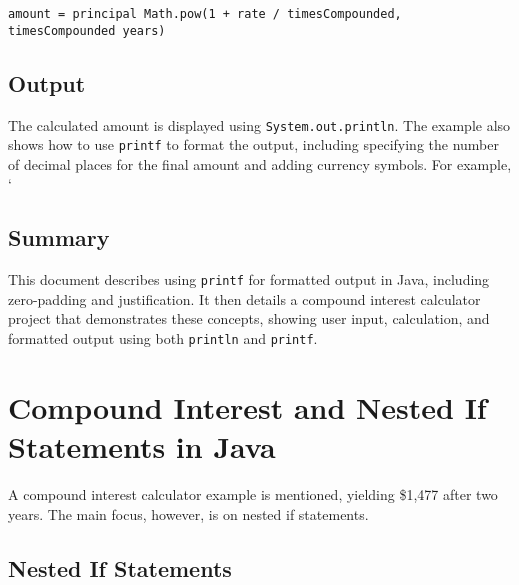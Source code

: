 \documentclass{article}
\begin{document}
\texttt{amount = principal \* Math.pow(1 + rate / timesCompounded, timesCompounded \* years)}

\subsection{Output}

The calculated amount is displayed using \texttt{System.out.println}.  The example also shows how to use \texttt{printf} to format the output, including specifying the number of decimal places for the final amount and adding currency symbols.  For example, `%

\subsection{Summary}

This document describes using \texttt{printf} for formatted output in Java, including zero-padding and justification.  It then details a compound interest calculator project that demonstrates these concepts, showing user input, calculation, and formatted output using both \texttt{println} and \texttt{printf}.


\section{Compound Interest and Nested If Statements in Java}

A compound interest calculator example is mentioned, yielding \$1,477 after two years.  The main focus, however, is on nested if statements.

\subsection{Nested If Statements}

\end{document}
